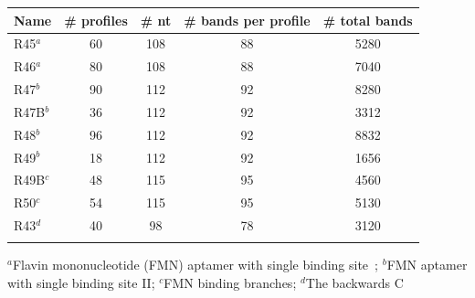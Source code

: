 \begin{table}
{\begin{tabular}{lcccc}
\toprule
Name& \# profiles & \# nt & \# bands per profile & \# total bands \\
\midrule
R45$^a$  &60&	108&	88&	5280\\
R46$^a$  &80&	108&	88&	7040\\
R47$^b$  &90&	112&	92&	8280\\
R47B$^b$  &36&	112&	92&	3312\\
R48$^b$  &96&	112&	92&	8832\\
R49$^b$  &18&	112&	92&	1656\\
R49B$^c$  &48&	115&	95&	4560\\
R50$^c$  &54&	115&	95&	5130\\
R43$^d$  &40&	98&	78&	3120\\
\botrule
\end{tabular}}
{$^a$Flavin mononucleotide (FMN) aptamer with single binding site~\citep{lee2014eterna}; $^b$FMN aptamer with single binding site II; $^c$FMN binding branches; $^d$The backwards C%
}
\end{table}



